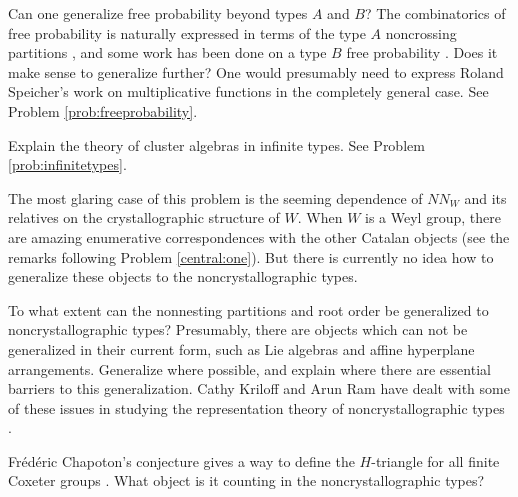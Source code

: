 \begin{problemblock}
\begin{remark}
Can one generalize free probability beyond types $A$ and $B$? The combinatorics of free probability is naturally expressed in terms of the type $A$ noncrossing partitions \cite{speicher:survey}, and some work has been done on a type $B$ free probability \cite{biane-goodman-nica}. Does it make sense to generalize further? One would presumably need to express Roland Speicher's work on multiplicative functions \cite{speicher} in the completely general case. See Problem \ref{prob:freeprobability}.
\end{remark}

\begin{remark}
Explain the theory of cluster algebras in infinite types. See Problem \ref{prob:infinitetypes}.
\end{remark}

\begin{remark}
 The most glaring case of this problem is the seeming dependence of $NN_W$ and its relatives on the crystallographic structure of $W$. When $W$ is a Weyl group, there are amazing enumerative correspondences with the other Catalan objects (see the remarks following Problem \ref{central:one}). But there is currently no idea how to generalize these objects to the noncrystallographic types.

To what extent can the nonnesting partitions and root order be generalized to noncrystallographic types? Presumably, there are objects which can not be generalized in their current form, such as Lie algebras and affine hyperplane arrangements. Generalize where possible, and explain where there are essential barriers to this generalization. Cathy Kriloff and Arun Ram have dealt with some of these issues in studying the representation theory of noncrystallographic types \cite{kriloff-ram}.

Fr\'ed\'eric Chapoton's conjecture gives a way to define the $H$-triangle for all finite Coxeter groups \cite{chapoton:two}. What object is it counting in the noncrystallographic types?
\end{remark}

\end{problemblock}


